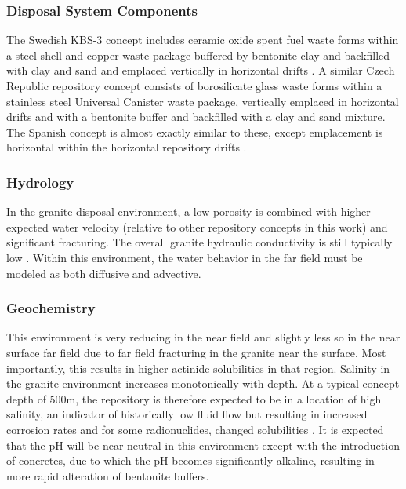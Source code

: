 \subsubsection{Disposal System Components}

The Swedish KBS-3 concept includes ceramic oxide spent fuel waste forms within a 
steel shell and copper waste package buffered by bentonite clay and backfilled 
with clay and sand and emplaced vertically in horizontal drifts 
\cite{ab_long-term_2006}.
A similar Czech Republic repository concept consists of 
borosilicate glass waste forms within a stainless steel Universal Canister waste 
package, vertically emplaced in horizontal drifts and with a bentonite buffer  
and backfilled with a clay and sand mixture.
The Spanish concept is almost exactly similar to 
these, except emplacement is horizontal within the horizontal repository drifts
\cite{ von_lensa_red-impact_2008}.




\subsubsection{Hydrology}

In the granite disposal environment, a low porosity is combined with 
higher expected water velocity (relative to other repository concepts in this 
work) and significant fracturing. The overall 
granite hydraulic conductivity is still typically low
\cite{schwartz_fundamentals_2004, 
hardin_generic_2011}. Within this environment, the  
water behavior in the far field must be modeled as both diffusive and advective.

\subsubsection{Geochemistry}

This environment is very reducing in the near field and slightly less so in the 
near surface far field due to far field fracturing in the granite near the 
surface. Most importantly, this results in higher actinide solubilities in that 
region. Salinity in the granite environment increases monotonically with depth. 
At a typical concept depth of 500m, the repository is therefore expected to be 
in a location of high salinity, an indicator of historically low fluid flow but 
resulting in increased corrosion rates and for some radionuclides, changed 
solubilities \cite{andra_granite:_2005}.  It is expected that the pH will be 
near neutral in this environment except with  the introduction of concretes, 
due to which the pH becomes significantly alkaline, resulting in more rapid 
alteration of bentonite buffers. 

